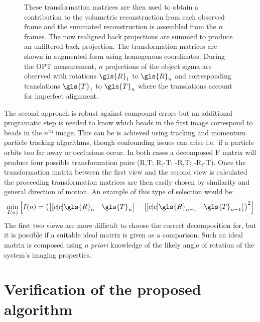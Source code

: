\begin{figure}
{    These transformation matrices are then used to obtain a contribution to the volumetric reconstruction from each observed frame and the summated reconstruction is assembled from the \(n\) frames.
    The now realigned back projections are summed to produce an unfiltered back projection.
    The transformation matrices are shown in augmented form using homogenous coordinates.
    During the \gls{OPT} measurement, \(n\) projections of the object sigma are observed with rotations \(\gls{R}_1\) to \(\gls{R}_n\) and corresponding translations \(\gls{T}_1\) to \(\gls{T}_n\) where the translations account for imperfect alignment. %
    }\label{fig:flopt_algorithm}
\end{figure}

The second approach is robust against compound errors but an additional programatic step is needed to know which beads in the first image correspond to beads in the \(n^{\text{th}}\) image.
This can be is achieved using tracking and momentum particle tracking algorithms, though confounding issues can arise i.e.~if a particle orbits too far away or occlusions occur.
In both cases a decomposed \gls{F} matrix will produce four possible transformation pairs (\gls{R},\gls{T}; \gls{R},-\gls{T}; -\gls{R},\gls{T}; -\gls{R},-\gls{T}). %
Once the transformation matrix between the first view and the second view is calculated the proceeding transformation matrices are then easily chosen by similarity and general direction of motion.
An example of this type of selection would be:
\begin{align}
\min_{I(n)}\left[I(n) = \left(\begin{bmatrix}[c|c] \gls{R}_n&\gls{T}_n \end{bmatrix} - \begin{bmatrix}[c|c] \gls{R}_{n-1}&\gls{T}_{n-1} \end{bmatrix}\right)^2\right]
\end{align}
The first two views are more difficult to choose the correct decomposition for, but it is possible if a suitable ideal matrix is given as a comparison.
Such an ideal matrix is composed using \emph{a priori} knowledge of the likely angle of rotation of the system's imaging properties.

\section{Verification of the proposed algorithm}

